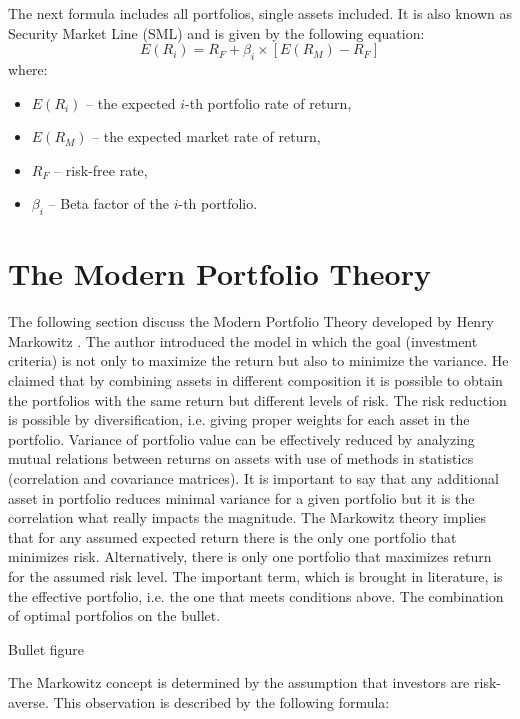 \documentclass{pracamgr_wne}\usepackage[]{graphicx}\usepackage[]{color}
\begin{document}
The next formula includes all portfolios, single assets included. It is also known as Security Market Line (SML) and is given by the following equation:
\begin{equation} \label{eq:erl}
E(R_i)=R_F+\beta_i\times[E(R_M)-R_F]
\end{equation}
where:
\begin{itemize}
\item $E(R_i)$ -- the expected $i$-th portfolio rate of return,
\item $E(R_M)$ -- the expected market rate of return,
\item $R_F$ -- risk-free rate,
\item $\beta_i$ -- Beta factor of the $i$-th portfolio.
\end{itemize}

\section{The Modern Portfolio Theory}
The following section discuss the Modern Portfolio Theory developed by Henry Markowitz \parencite{Markowitz1952}. The author introduced the model in which the goal
(investment criteria) is 
not only to maximize the return but also to minimize the variance. He claimed that by combining assets in different composition it is possible to obtain the 
portfolios with the same return but different levels of risk. The risk reduction is possible by diversification, i.e. giving proper weights for each asset 
in the portfolio. Variance of portfolio value can be effectively reduced by analyzing mutual relations between returns on assets with use of methods in statistics
(correlation and covariance matrices). It is important to say that any additional asset in portfolio reduces minimal variance for a given portfolio 
but it is the correlation what really impacts the magnitude.
The Markowitz theory implies that for any assumed expected return there is the only one portfolio that minimizes risk. Alternatively, there is only one portfolio 
that maximizes return for the assumed risk level. The important term, which is brought in literature, is the effective portfolio, i.e. the one that meets conditions
above.
The combination of optimal portfolios on the bullet.

Bullet figure

The Markowitz concept is determined by the assumption that investors are risk-averse. This observation is described by the following formula:
\end{document}
